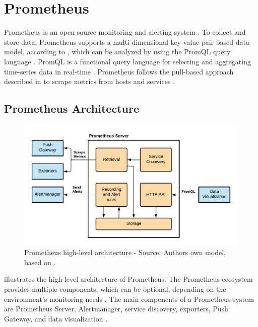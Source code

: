 \section{Prometheus}
\label{sec:04_prom}
Prometheus is an open-source monitoring and alerting system \cite{Prom2020Docs}.
To collect and store data, Prometheus supports a multi-dimensional key-value pair based data model, according to , which can be analyzed by using the PromQL query language \cite{Pandey2020Monitoring}.
PromQL is a functional query language for selecting and aggregating time-series data in real-time \cite{Prom2020Docs}.
Prometheus follows the pull-based approach described in  to scrape metrics from hosts and services \cite{Bastos2019Prom}.


\subsection{Prometheus Architecture}
\label{sec:04_prom_arch}
\begin{figure}[h]
\centering
\includegraphics[scale=0.8]{images/04_technical_background/prometheus/prometheus_architecture}
\caption{Prometheus high-level architecture - Source: Authors own model, based on \cite{Prom2020Docs, Brazil2018Prom}.}
\label{fig:prom_architecture}
\end{figure}

 illustrates the high-level architecture of Prometheus.
The Prometheus ecosystem provides multiple components, which can be optional, depending on the environment's monitoring needs \cite{Bastos2019Prom}. The main components of a Prometheus system are Prometheus Server, Alertmanager, service discovery, exporters, Push Gateway, and data visualization \cite{Prom2020Docs}.

